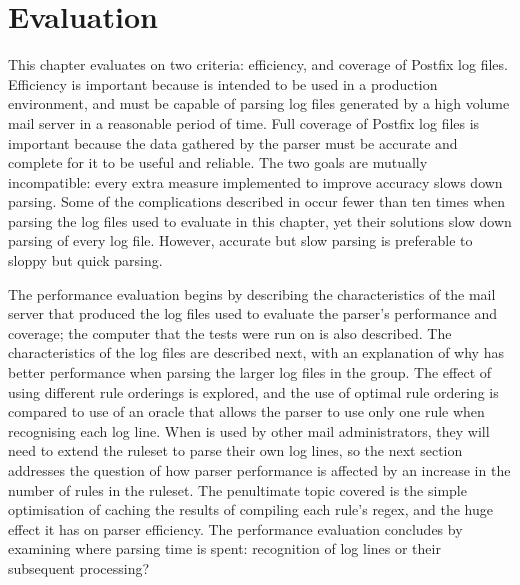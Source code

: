 \chapter{Evaluation}

\label{Evaluation}

\renewcommand{\figurename}{Graph}

\addtolength{\tabcolsep}{-2pt}

This chapter evaluates \parsername{} on two criteria: efficiency, and
coverage of  Postfix log files.  Efficiency is important because
\parsername{} is intended to be used in a production environment, and must
be capable of parsing log files generated by a high volume mail server in a
reasonable period of time.  Full coverage of Postfix log files is important
because the data gathered by the parser must be accurate and complete for
it to be useful and reliable.  The two goals are mutually incompatible:
every extra measure implemented to improve accuracy slows down parsing.
Some of the complications described in  occur
fewer than ten times when parsing the \numberOFlogFILES{} log files used to
evaluate \parsername{} in this chapter, yet their solutions slow down
parsing of every log file.  However, accurate but slow parsing is
preferable to sloppy but quick parsing.

The performance evaluation begins by describing the characteristics of the
mail server that produced the log files used to evaluate the parser's
performance and coverage; the computer that the tests were run on is also
described.  The characteristics of the \numberOFlogFILES{} log files are
described next, with an explanation of why \parsername{} has better
performance when parsing the larger log files in the group.  The effect of
using different rule orderings is explored, and the use of optimal rule
ordering is compared to use of an oracle that allows the parser to use only
one rule when recognising each log line.  When \parsername{} is used by
other mail administrators, they will need to extend the ruleset to parse
their own log lines, so the next section addresses the question of how
parser performance is affected by an increase in the number of rules in the
ruleset.  The penultimate topic covered is the simple optimisation of
caching the results of compiling each rule's regex, and the huge effect it
has on parser efficiency.  The performance evaluation concludes by
examining where parsing time is spent: recognition of log lines or their
subsequent processing?

